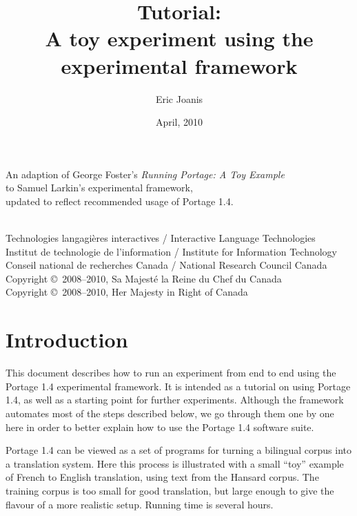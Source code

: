 \documentclass[11pt,letterpaper]{article}
\title{\PS Tutorial: \\
       A toy experiment using the \\
       experimental framework}
\date{April, 2010}
\author{Eric Joanis}
\newcommand{\PS}{Portage 1.4\xspace}
\begin{document}
\vfill

\maketitle

\vfill

\begin{center}
An adaption of George Foster's \emph{Running Portage: A Toy Example} \\
to Samuel Larkin's experimental framework,\\
updated to reflect recommended usage of \PS.
\end{center}

\vfill
\vfill

\begin{center}
{~} \\ \footnotesize
   Technologies langagi{\`e}res interactives /
      Interactive Language Technologies \\
   Institut de technologie de l'information /
      Institute for Information Technology \\
   Conseil national de recherches Canada /
      National Research Council Canada \\
   Copyright \copyright\ 2008--2010, Sa Majest{\'e} la Reine du Chef du Canada
   \\ Copyright \copyright\ 2008--2010, Her Majesty in Right of Canada
\end{center}

\vfill

\newpage

\vfill

\tableofcontents

\vfill

\newpage


\section{Introduction}

This document describes how to run an experiment from end to end using the \PS
experimental framework. It is intended as a tutorial on using \PS, as well as a
starting point for further experiments.  Although the framework automates most
of the steps described below, we go through them one by one here in order to
better explain how to use the \PS software suite.

\PS can be viewed as a set of programs for turning a bilingual corpus into a
translation system. Here this process is illustrated with a small ``toy''
example of French to English translation, using text from the Hansard corpus.
The training corpus is too small for good translation, but large enough to give
the flavour of a more realistic setup. Running time is several hours.
\end{document}
